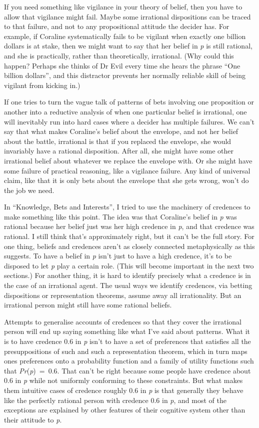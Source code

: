 \documentclass[
  10pt,
  letterpaper,
  twoside]{scrbook}
\begin{document}
If you need something like vigilance in your theory of belief, then you
have to allow that vigilance might fail. Maybe some irrational
dispositions can be traced to that failure, and not to any propositional
attitude the decider has. For example, if Coraline systematically fails
to be vigilant when exactly one billion dollars is at stake, then we
might want to say that her belief in \emph{p} is still rational, and she
is practically, rather than theoretically, irrational. (Why could this
happen? Perhaps she thinks of Dr Evil every time she hears the phrase
``One billion dollars'', and this distractor prevents her normally
reliable skill of being vigilant from kicking in.)

If one tries to turn the vague talk of patterns of bets involving one
proposition or another into a reductive analysis of when one particular
belief is irrational, one will inevitably run into hard cases where a
decider has multiple failures. We can't say that what makes Coraline's
belief about the envelope, and not her belief about the battle,
irrational is that if you replaced the envelope, she would invariably
have a rational disposition. After all, she might have some other
irrational belief about whatever we replace the envelope with. Or she
might have some failure of practical reasoning, like a vigilance
failure. Any kind of universal claim, like that it is only bets about
the envelope that she gets wrong, won't do the job we need.

In ``Knowledge, Bets and Interests'', I tried to use the machinery of
credences to make something like this point. The idea was that
Coraline's belief in \emph{p} was rational because her belief just was
her high credence in \emph{p}, and that credence was rational. I still
think that's approximately right, but it can't be the full story. For
one thing, beliefs and credences aren't as closely connected
metaphysically as this suggests. To have a belief in \emph{p} isn't just
to have a high credence, it's to be disposed to let \emph{p} play a
certain role. (This will become important in the next two sections.) For
another thing, it is hard to identify precisely what a credence is in
the case of an irrational agent. The usual ways we identify credences,
via betting dispositions or representation theorems, assume away all
irrationality. But an irrational person might still have some rational
beliefs.

Attempts to generalise accounts of credences so that they cover the
irrational person will end up saying something like what I've said about
patterns. What it is to have credence 0.6 in \emph{p} isn't to have a
set of preferences that satisfies all the presuppositions of such and
such a representation theorem, which in turn maps ones preferences onto
a probability function and a family of utility functions such that
\emph{Pr}(\emph{p})~=~0.6. That can't be right because some people have
credence about 0.6 in \emph{p} while not uniformly conforming to these
constraints. But what makes them intuitive cases of credence roughly 0.6
in \emph{p} is that generally they behave like the perfectly rational
person with credence 0.6 in \emph{p}, and most of the exceptions are
explained by other features of their cognitive system other than their
attitude to \emph{p}.
\end{document}
